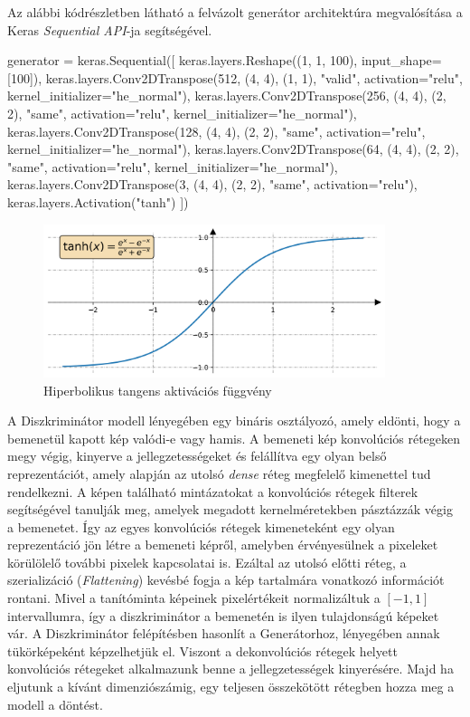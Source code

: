 Az alábbi kódrészletben látható a felvázolt generátor architektúra megvalósítása a Keras \textit{Sequential API}-ja segítségével.

\begin{python}
generator = keras.Sequential([
    keras.layers.Reshape((1, 1, 100), input_shape=[100]),
    keras.layers.Conv2DTranspose(512, (4, 4), (1, 1), "valid",
                                 activation="relu",
                                 kernel_initializer="he_normal"),
    keras.layers.Conv2DTranspose(256, (4, 4), (2, 2), "same",
                                 activation="relu",
                                 kernel_initializer="he_normal"),
    keras.layers.Conv2DTranspose(128, (4, 4), (2, 2), "same",
                                 activation="relu",
                                 kernel_initializer="he_normal"),
    keras.layers.Conv2DTranspose(64, (4, 4), (2, 2), "same",
                                 activation="relu",
                                 kernel_initializer="he_normal"),
    keras.layers.Conv2DTranspose(3, (4, 4), (2, 2), "same",
                                 activation="relu"),
    keras.layers.Activation("tanh")
])
\end{python}

\begin{figure}[h]
\centering
\includegraphics[width=10cm]{images/tanh.png}
\caption{Hiperbolikus tangens aktivációs függvény}
\label{fig:tanh}
\end{figure}


A Diszkriminátor modell lényegében egy bináris osztályozó, amely eldönti, hogy a bemenetül kapott kép valódi-e vagy hamis. A bemeneti kép konvolúciós rétegeken megy végig, kinyerve a jellegzetességeket és felállítva egy olyan belső reprezentációt, amely alapján az utolsó \textit{dense} réteg megfelelő kimenettel tud rendelkezni. A képen található mintázatokat a konvolúciós rétegek filterek segítségével tanulják meg, amelyek megadott kernelméretekben pásztázzák végig a bemenetet. Így az egyes konvolúciós rétegek kimeneteként egy olyan reprezentáció jön létre a bemeneti képről, amelyben érvényesülnek a pixeleket körülölelő további pixelek kapcsolatai is. Ezáltal az utolsó előtti réteg, a szerializáció (\textit{Flattening}) kevésbé fogja a kép tartalmára vonatkozó információt rontani. Mivel a tanítóminta képeinek pixelértékeit normalizáltuk a $[-1, 1]$ intervallumra, így a diszkriminátor a bemenetén is ilyen tulajdonságú képeket vár. A Diszkriminátor felépítésben hasonlít a Generátorhoz, lényegében annak tükörképeként képzelhetjük el. Viszont a dekonvolúciós rétegek helyett konvolúciós rétegeket alkalmazunk benne a jellegzetességek kinyerésére. Majd ha eljutunk a kívánt dimenziószámig, egy teljesen összekötött rétegben hozza meg a modell a döntést.

